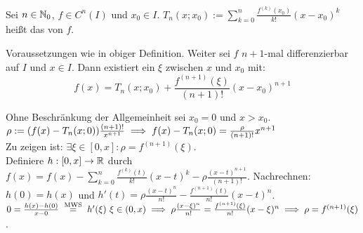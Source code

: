 \documentclass[a4paper,oneside,DIV15,BCOR12mm]{scrbook}
\begin{document}
\begin{definition}
Sei $n\in\mathbb{N}_0$, $f\in C^n(I)$ und $x_0 \in I$. $T_n(x;x_0) := \sum_{k=0}^n \frac{f^{(k)}(x_0)}{k!}(x-x_0)^k$ heißt das  von $f$.
\end{definition}

\begin{satz}
Voraussetzungen wie in obiger Definition. Weiter sei $f$ $n+1$-mal differenzierbar auf $I$ und $x\in I$. Dann existiert ein $\xi$ zwischen $x$ und $x_0$ mit:
$$ f(x) = T_n(x;x_0) + \frac{f^{(n+1)}(\xi)}{(n+1)!}(x-x_0)^{n+1}$$
\end{satz}

\begin{beweis}
Ohne Beschränkung der Allgemeinheit sei $x_0 = 0$ und $x>x_0$.\\
$\rho := (f(x) - T_n(x;0)) \frac{(n+1)!}{x^{n+1}} \implies f(x) - T_n(x;0) = \frac{\rho}{(n+1)!}x^{n+1}$\\
Zu zeigen ist: $\exists \xi\in[0,x]: \rho = f^{(n+1)}(\xi).$ \\
Definiere $h: [0,x]\to \mathbb{R}$ durch $f(x) = f(x) - \sum_{k=0}^n \frac{f^{(k)}(t)}{k!} (x-t)^k - \rho\frac{(x-t)^{n+1}}{(n+1)!}$. 
Nachrechnen: $h(0) = h(x)$ und $h'(t) = \rho\frac{(x-t)^n}{n!} - \frac{f^{(n+1)}(t)}{n!}(x-t)^n$. \\
$0 = \frac{h(x)-h(0)}{x-0} \gleichnach{MWS} h'(\xi) \ \xi \in (0,x) \folgt \rho\frac{(x-\xi)^n}{n!} = \frac{f^{(n+1)}(\xi)}{n!}(x-\xi)^n \folgt \rho = f^{(n+1)}(\xi)$.
\end{beweis}
\end{document}
